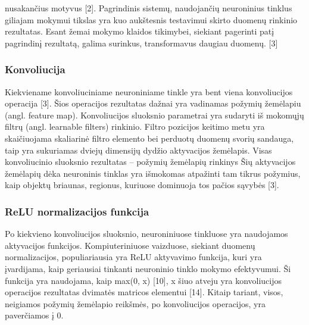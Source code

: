 \documentclass{VUMIFInfBakalaurinis}
\begin{document}
nusakančius motyvus [2]. Pagrindinis sistemų, naudojančių neuroninius tinklus giliajam mokymui tikslas yra kuo aukštesnis testavimui skirto duomenų rinkinio rezultatas. Esant žemai mokymo klaidos tikimybei, siekiant pagerinti patį pagrindinį rezultatą, galima surinkus, transformavus daugiau duomenų. [3]

\subsubsection{Konvoliucija}
Kiekviename konvoliuciniame neuroniniame tinkle yra bent viena konvoliucijos operacija [3].  Šios operacijos rezultatas dažnai yra vadinamas požymių žemėlapiu (angl. feature map). Konvoliucijos sluoksnio parametrai yra sudaryti iš mokomųjų filtrų (angl. learnable filters) rinkinio. Filtro pozicijos keitimo metu yra skaičiuojama skaliarinė filtro elemento bei perduotų duomenų svorių sandauga, taip yra sukuriamas dviejų dimensijų dydžio aktyvacijos žemėlapis. Visas konvoliucinio sluoksnio rezultatas – požymių žemėlapių rinkinys Šių aktyvacijos žemėlapių dėka neuroninis tinklas yra išmokomas atpažinti tam tikrus požymius, kaip objektų briaunas,  regionus, kuriuose dominuoja tos pačios sąvybės [3]. 

\subsubsection{ReLU normalizacijos funkcija}
Po kiekvieno konvoliucijos sluoksnio, neuroniniuose tinkluose yra naudojamos aktyvacijos funkcijos. Kompiuteriniuose vaizduose, siekiant duomenų normalizacijos, populiariausia yra ReLU aktyvavimo funkcija, kuri yra įvardijama, kaip geriausiai tinkanti neuroninio tinklo mokymo efektyvumui. Ši funkcija yra naudojama, kaip max(0, x) [10], x šiuo atveju yra konvoliucijos operacijos rezultatas dvimatės matricos elementui [14]. Kitaip tariant, visos, neigiamos požymių žemėlapio reikšmės, po konvoliucijos operacijos, yra paverčiamos į 0. 
\end{document}

